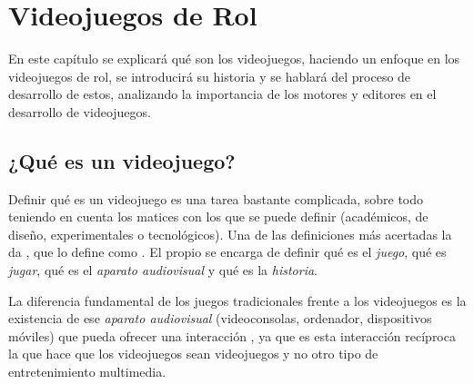 \chapter{Videojuegos de Rol}
\label{cap:videojuegosrol}

\begin{resumen}
En este capítulo se explicará qué son los videojuegos, haciendo un enfoque en los videojuegos de rol, se introducirá su historia y se hablará del proceso de desarrollo de estos, analizando la importancia de los motores y editores en el desarrollo de videojuegos.
\end{resumen}

\section{¿Qué es un videojuego?}
Definir qué es un videojuego es una tarea bastante complicada, sobre todo teniendo en cuenta los matices con los que se puede definir (académicos, de diseño, experimentales o tecnológicos). Una de las definiciones más acertadas la da \cite{EspositoVJ}, que lo define como . El propio \citeauthor{EspositoVJ} se encarga de definir qué es el \textit{juego}, qué es \textit{jugar}, qué es el \textit{aparato audiovisual} y qué es la \textit{historia}.

\smallskip

La diferencia fundamental de los juegos tradicionales frente a los videojuegos es la existencia de ese \textit{aparato audiovisual} (videoconsolas, ordenador, dispositivos móviles) que pueda ofrecer una interacción , ya que es esta interacción recíproca la que hace que los videojuegos sean videojuegos y no otro tipo de entretenimiento multimedia.

\medskip

